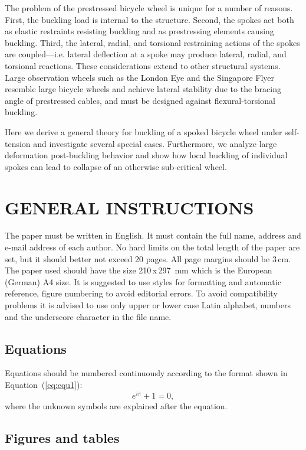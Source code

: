 \documentclass{bmd2016p}
\begin{document}
The problem of the prestressed bicycle wheel is unique for a number of reasons. First, the buckling load is internal to the structure. Second, the spokes act both as elastic restraints resisting buckling and as prestressing elements causing buckling. Third, the lateral, radial, and torsional restraining actions of the spokes are coupled---i.e. lateral deflection at a spoke may produce lateral, radial, and torsional reactions. These considerations extend to other structural systems. Large observation wheels such as the London Eye\cite{Mann} and the Singapore Flyer\cite{All} resemble large bicycle wheels and achieve lateral stability due to the bracing angle of prestressed cables, and must be designed against flexural-torsional buckling.

Here we derive a general theory for buckling of a spoked bicycle wheel under self-tension and investigate several special cases. Furthermore, we analyze large deformation post-buckling behavior and show how local buckling of individual spokes can lead to collapse of an otherwise sub-critical wheel.


\section{GENERAL INSTRUCTIONS}

The paper must be written in English. It must contain the full name, address 
and e-mail address of each author. No hard limits on the total length of the 
paper are set, but it should better not exceed 20 pages. All page margins 
should be 3\,cm. The paper used should have the size 210\,x\,297\, mm 
which is the European (German) A4 size. It is suggested to use styles for 
formatting and automatic reference, figure numbering to avoid editorial 
errors. To avoid compatibility problems it is advised to use only upper or 
lower case Latin alphabet, numbers and the underscore character in the file 
name.


\subsection{Equations}

Equations should be numbered continuously according to the format shown in 
Equation~(\ref{eq:equ1}): 
\begin{equation} \label{eq:equ1}
  e^{i\pi} + 1 = 0, 
\end{equation}
where the unknown symbols are explained after the equation.


\subsection{Figures and tables}
\end{document}
